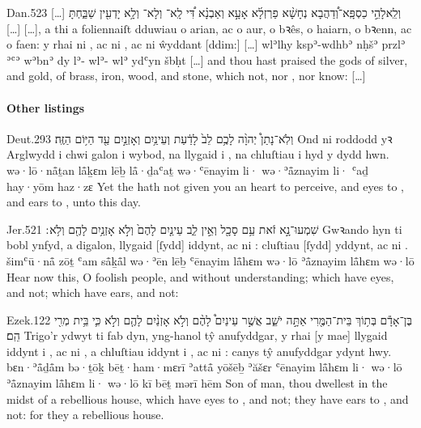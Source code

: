 \begin{example}{Dan.}{5}{23}{}{}
	\quoling
	{[…] וְלֵֽאלָהֵ֣י כַסְפָּֽא־וְ֠דַהֲבָא נְחָשָׁ֨א פַרְזְלָ֜א אָעָ֣א וְאַבְנָ֗א דִּ֠י לָֽא־ וְלָא־ וְלָ֥א יָדְעִ֖ין שַׁבַּ֑חְתָּ […]}
	{[…], a thi a foliennaiſt dduwiau o arian, ac o aur, o bꝛês, o haiarn, o bꝛenn, ac o faen: y rhai ni , ac ni , ac ni ŵyddant [ddim:] […]}
	{wlʾlhy kspʾ-wdhbʾ nḥšʾ przlʾ ʾʿʾ wʾbnʾ dy lʾ- wlʾ- wlʾ ydʿyn šbḥt}
	{[…] and thou hast praised the gods of silver, and gold, of brass, iron, wood, and stone, which  not, nor , nor know: […]}
\end{example}



\paragraph{Other listings}

\begin{example}{Deut.}{29}{3}{}{}
	\quoling
	{וְלֹֽא־נָתַן֩ יְהוָ֨ה לָכֶ֥ם לֵב֙ לָדַ֔עַת וְעֵינַ֥יִם  וְאָזְנַ֣יִם  עַ֖ד הַיּ֥וֹם הַזֶּֽה׃}
	{Ond ni roddodd yꝛ Arglwydd i chwi galon i wybod, na llygaid i , na chluſtiau i  hyd y dydd hwn.}
	{wə·lō·nå̄ṯan {\YHWH} lå̄ḵɛm lēḇ lå̄·ḏaʿaṯ wə·ʿēnayim li· wə·ʾå̄znayim li· ʿaḏ hay·yōm haz·zɛ}
	{Yet the {\LORD} hath not given you an heart to perceive, and eyes to , and ears to , unto this day.}
\end{example}

\begin{example}{Jer.}{5}{21}{}{}
	\quoling
	{שִׁמְעוּ־נָ֣א זֹ֔את עַ֥ם סָכָ֖ל וְאֵ֣ין לֵ֑ב עֵינַ֤יִם לָהֶם֙ וְלֹ֣א  אָזְנַ֥יִם לָהֶ֖ם וְלֹ֥א ׃}
	{Gwꝛando hyn ti bobl ynfyd, a digalon, llygaid [ſydd] iddynt, ac ni : cluſtiau [ſydd] yddynt, ac ni .}
	{šimʿū·nå̄ zōṯ ʿam så̄ḵå̄l wə·ʾēn lēḇ ʿēnayim lå̄hɛm wə·lō  ʾå̄znayim lå̄hɛm wə·lō }
	{Hear now this, O foolish people, and without understanding; which have eyes, and  not; which have ears, and  not:}
\end{example}

\begin{example}{Ezek.}{12}{2}{}{}
	\quoling
	{בֶּן־אָדָ֕ם בְּת֥וֹךְ בֵּית־הַמֶּ֖רִי אַתָּ֣ה יֹשֵׁ֑ב אֲשֶׁ֣ר עֵינַיִם֩ לָהֶ֨ם  וְלֹ֣א  אָזְנַ֨יִם לָהֶ֤ם  וְלֹ֣א  כִּ֛י בֵּ֥ית מְרִ֖י הֵֽם׃}
	{Trigo’r ydwyt ti fab dyn, yng-hanol tŷ anufyddgar, y rhai [y mae] llygaid iddynt i , ac ni , a chluſtiau iddynt i , ac ni : canys tŷ anufyddgar ydynt hwy.}
	{bɛn·ʾå̄ḏå̄m bə·ṯōḵ bēṯ·ham·mɛrī ʾattå̄ yōšēḇ ʾăšɛr ʿēnayim lå̄hɛm li· wə·lō  ʾå̄znayim lå̄hɛm li· wə·lō  kī bēṯ mərī hēm}
	{Son of man, thou dwellest in the midst of a rebellious house, which have eyes to , and  not; they have ears to , and  not: for they  a rebellious house.}
\end{example}

